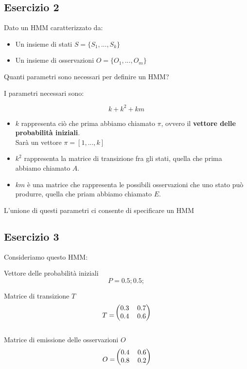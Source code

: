\documentclass{article}
\begin{document}
\pagebreak
	\subsection{Esercizio 2}
	Dato un HMM caratterizzato da:
	\begin{itemize}
		\item Un insieme di stati $S = \{S_1, ..., S_k\}$
		\item Un insieme di osservazioni  $O = \{O_1, ..., O_m\}$
	\end{itemize}
	
	Quanti parametri sono necessari per definire un HMM?
	
	I parametri necessari sono:
	
	\[
		k + k^2 + km
	\]
	
\begin{itemize}
	\item $k$ rappresenta ciò che prima abbiamo chiamato $\pi$, ovvero il \textbf{vettore delle probabilità iniziali}. \\
	Sarà un vettore $\pi = [1, ..., k]$
	
	\item $k^2$ rappresenta la matrice di transizione fra gli stati, quella che prima abbiamo chiamato $A$.
	
	\item $km$ è una matrice che rappresenta le possibili osservazioni che uno stato può produrre, quella che priam abbiamo chiamato $E$.
\end{itemize}

L'unione di questi parametri ci consente di specificare un HMM

\pagebreak

\subsection{Esercizio 3}

Consideriamo questo HMM:

Vettore delle probabilità iniziali
\[P  = 0.5; 0.5;\]

Matrice di transizione $T$
\[
T = 
\begin{blockarray}{cc}
	\begin{block}{(cc)}
		0.3  &  0.7   \\
		0.4  &  0.6   \\
	\end{block}
\end{blockarray}
\]	

Matrice di emissione delle osservazioni  $O$
\[
O = 
\begin{blockarray}{cc}
	\begin{block}{(cc)}
		0.4  &  0.6   \\
		0.8  &  0.2   \\
	\end{block}
\end{blockarray}
\]	
\end{document}
